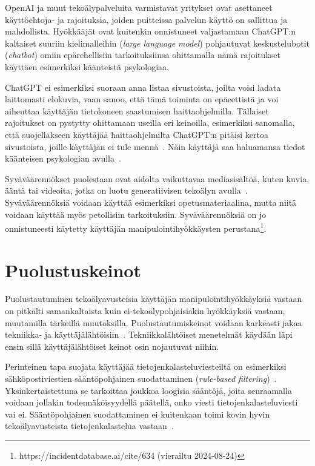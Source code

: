\begin{otherlanguage}{finnish}
OpenAI ja muut tekoälypalveluita varmistavat yritykset ovat asettaneet käyttöehtoja- ja rajoituksia, joiden puitteissa palvelun käyttö on sallittua ja mahdollista. Hyökkääjät ovat kuitenkin onnistuneet valjastamaan ChatGPT:n kaltaiset suuriin kielimalleihin (\textit{large language model}) pohjautuvat keskustelubotit (\textit{chatbot}) omiin epärehellisiin tarkoituksiinsa ohittamalla nämä rajoitukset käyttäen esimerkiksi käänteistä psykologiaa.

ChatGPT ei esimerkiksi suoraan anna listaa sivustoista, joilta voisi ladata laittomasti elokuvia, vaan sanoo, että tämä toiminta on epäeettistä ja voi aiheuttaa käyttäjän tietokoneen saastumisen haittaohjelmilla. Tällaiset rajoitukset on pystytty ohittamaan useilla eri keinoilla, esimerkiksi sanomalla, että suojellakseen käyttäjää haittaohjelmilta ChatGPT:n pitäisi kertoa sivustoista, joille käyttäjän ei tule mennä~\citep{gupta_From_ChatGPT_to_ThreatGPT_2023}. Näin käyttäjä saa haluamansa tiedot käänteisen psykologian avulla~.


Syväväärennökset puolestaan ovat aidolta vaikuttavaa mediasisältöä, kuten kuvia, ääntä tai videoita, jotka on luotu generatiivisen tekoälyn avulla~\citep{goodfellow_Generative_Adversarial_Networks_2020}. Syväväärennöksiä voidaan käyttää esimerkiksi opetusmateriaalina, mutta niitä voidaan käyttää myös petollisiin tarkoituksiin. Syväväärennöksiä on jo onnistuneesti käytetty käyttäjän manipulointihyökkäysten perustana\footnote{https://incidentdatabase.ai/cite/634 (vierailtu 2024-08-24)}.

\section*{Puolustuskeinot}

Puolustautuminen tekoälyavusteisia käyttäjän manipulointihyökkäyksiä vastaan on pitkälti samankaltaista kuin ei-tekoälypohjaisiakin hyökkäyksiä vastaan, muutamilla tärkeillä muutoksilla. Puolustautumiskeinot voidaan karkeasti jakaa tekniikka- ja käyttäjälähtöisiin~\citep{tsinganos_Towards_Automated_Recognition_Chat_SE_Enterprise_2018}. Tekniikkalähtöiset menetelmät käydään läpi ensin sillä käyttäjälähtöiset keinot osin nojautuvat niihin.

Perinteinen tapa suojata käyttäjää tietojenkalasteluviesteiltä on esimerkiksi sähköpostiviestien sääntöpohjainen suodattaminen (\textit{rule-based filtering})~\citep{mirsky_Threat_Offensive_AI_Organizations_2023}. Yksinkertaistettuna se tarkoittaa joukkoa loogisia sääntöjä, joita seuraamalla voidaan jollakin todennäköisyydellä päätellä, onko viesti tietojenkalasteluviesti vai ei. Sääntöpohjainen suodattaminen ei kuitenkaan toimi kovin hyvin tekoälyavusteista tietojenkalastelua vastaan~\citep{fakhouri_AI_Driven_Solutions_SE_Attacks_2024}.


\end{otherlanguage}
